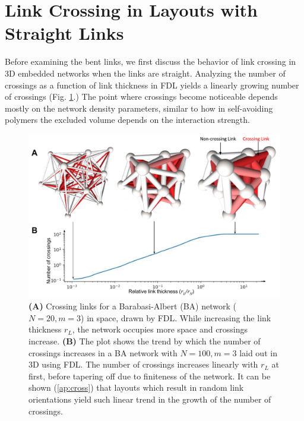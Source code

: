 \documentclass[endfloats,nofootinbib,preprint,floatfix,titlepage,superscriptaddress,linenumbers]{revtex4-1} %
\newcommand{\outNim}[1]{}
\begin{document}
\section{Link Crossing in Layouts with Straight Links \label{ap:cross}}
Before examining the bent links, we first discuss the behavior of link crossing in 3D embedded networks when the links are straight. 
Analyzing the number of crossings as a function of link thickness in FDL yields a linearly growing number of crossings
\outNim{
\footnote{The exact properties of the point where the crossings start is not our primary concern here, but it seems to start at a certain nonzero thickness. 
This sharp phase transition is actually a feature of these connected networks with FDL. 
The transition disappears, as expected, in a system of randomly oriented disconnected links in 3D. 
The length scale at which this phase transition occurs is a function of some dimensionful parameter that can naturally arise from the difference in the form of the repulsive node forces and the attractive forces on the links. We did experiment adding noise to the layout and also randomly switched links around. While these changes increased the slope of the line of the crossings (generally showing more crossings than FDL) they did {\em not} move the point of the phase transition appreciably.}
}(Fig. \ref{fig:crs}.) 
The point where crossings become noticeable depends mostly on the network density parameters, similar to how in self-avoiding polymers the excluded volume depends on the interaction strength. 
\begin{figure}
    \centering
    \includegraphics[width=.7\columnwidth]{fig-09-19/3D-cross.pdf}
    \caption{\scriptsize
    {\bf (A)}  Crossing links for a Barabasi-Albert (BA) network ($N = 20, m = 3$) in space, drawn by FDL. While increasing the link thickness $r_L$, the network occupies more space and crossings increase. 
    {\bf (B)} The plot shows the trend by which the number of crossings increases in a BA network with $N=100, m =3$ laid out in 3D using FDL.
    The number of crossings increases linearly with $r_L$ at first, before tapering off due to finiteness of the network. It can be shown (\ref{ap:cross}) that layouts which result in random link orientations yield such linear trend in the growth of the number of crossings.
    }     
    \label{fig:crs}
\end{figure}
\end{document}
